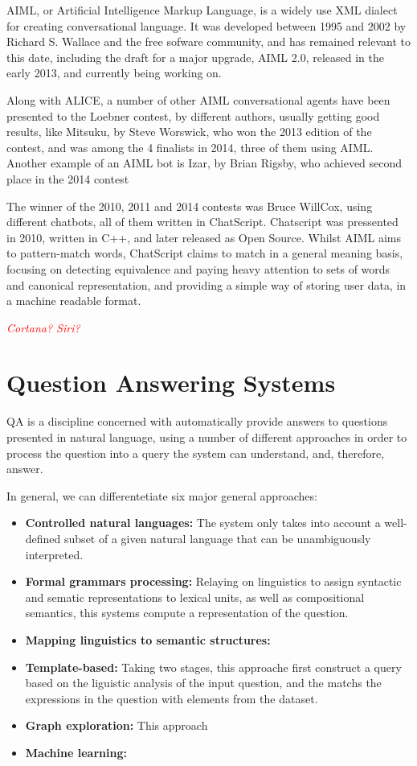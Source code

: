 AIML, or Artificial Intelligence Markup Language, is a widely use XML dialect for creating conversational language. It was developed between 1995 and 2002 by Richard S. Wallace and the free sofware community, and has remained relevant to this date, including the draft for a major upgrade, AIML 2.0, released in the early 2013, and currently being working on.

Along with ALICE, a number of other AIML conversational agents have been presented to the Loebner contest, by different authors, usually getting good results, like Mitsuku, by Steve Worswick, who won the 2013 edition of the contest, and was among the 4 finalists in 2014, three of them using AIML. Another example of an AIML bot is Izar, by Brian Rigsby, who achieved second place in the 2014 contest

The winner of the 2010, 2011 and 2014 contests was Bruce WillCox, using different chatbots, all of them written in ChatScript. Chatscript was pressented in 2010, written in C++, and later released as Open Source. Whilst AIML aims to pattern-match words, ChatScript claims to match in a general meaning basis, focusing on detecting equivalence and paying heavy attention to sets of words and canonical representation, and providing a simple way of storing user data, in a machine readable format.

\emph{\textcolor{red}{Cortana? Siri?}}

\section{Question Answering Systems}
\label{sec:qa_sys}

\ac{QA} is a discipline concerned with automatically provide answers to questions presented in natural language, using a number of different approaches in order to process the question into a query the system can understand, and, therefore, answer.

In general, we can differentetiate six major general approaches:

\begin{itemize}
  \item \textbf{Controlled natural languages:} The system only takes into account a well-defined subset of a given natural language that can be unambiguously interpreted.
  \item \textbf{Formal grammars processing:} Relaying on linguistics to assign syntactic and sematic representations to lexical units, as well as compositional semantics, this systems compute a representation of the question.
  \item \textbf{Mapping linguistics to semantic structures: }
  \item \textbf{Template-based:} Taking two stages, this approache first construct a query based on the liguistic analysis of the input question, and the matchs the expressions in the question with elements from the dataset.
  \item \textbf{Graph exploration:} This approach 
  \item \textbf{Machine learning:}
\end{itemize}

